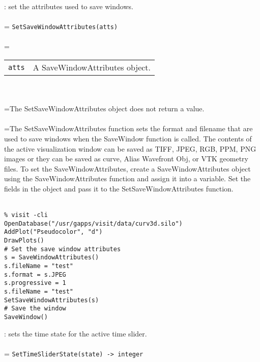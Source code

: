 \documentclass[10pt,a4paper]{report}
\begin{document}
{}
: set the attributes used to save windows.\\[-3mm]

 \\ 
\hangindent=\parindent 
\verb!SetSaveWindowAttributes(atts)!\\ [-3mm]

 \\ 
\hangindent=\parindent 
\begin{tabular}{ll}
\verb!atts! & A SaveWindowAttributes object. \\
\end{tabular} \\[-2mm]


 \\ 
\hangindent=\parindent The SetSaveWindowAttributes object does not return a value. \\[-3mm] 

 \\ 
\hangindent=\parindent The SetSaveWindowAttributes function sets the format and filename that are used to save windows when the SaveWindow function is called. The contents of the active visualization window can be saved as TIFF, JPEG, RGB, PPM, PNG images or they can be saved as curve, Alias Wavefront Obj, or VTK geometry files. To set the SaveWindowAttributes, create a SaveWindowAttributes object using the SaveWindowAttributes function and assign it into a variable. Set the fields in the object and pass it to the SetSaveWindowAttributes function. \\[-3mm] 

\\[-6mm]
\begin{verbatim}% visit -cli
OpenDatabase("/usr/gapps/visit/data/curv3d.silo")
AddPlot("Pseudocolor", "d")
DrawPlots()
# Set the save window attributes
s = SaveWindowAttributes()
s.fileName = "test"
s.format = s.JPEG
s.progressive = 1
s.fileName = "test"
SetSaveWindowAttributes(s)
# Save the window
SaveWindow()
\end{verbatim}
\newpage


{}
: sets the time state for the active time slider.\\[-3mm]

 \\ 
\hangindent=\parindent 
\verb!SetTimeSliderState(state) -> integer!\\ [-3mm]
\end{document}
